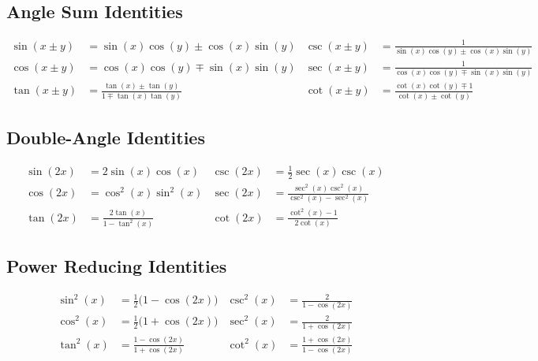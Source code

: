 \documentclass{article}
\begin{document}
\subsection{Angle Sum Identities}
\begin{align*}
	\sin{\left( x\pm y \right)} &= \sin{\left( x \right)} \cos{\left( y \right)} \pm \cos{\left( x \right)} \sin{\left( y \right)}           & \csc{\left( x\pm y \right)} &= \frac{1}{\sin{\left( x \right)} \cos{\left( y \right)} \pm \cos{\left( x \right)} \sin{\left( y \right)}} \\
	\cos{\left( x\pm y \right)} &= \cos{\left( x \right)} \cos{\left( y \right)} \mp \sin{\left( x \right)} \sin{\left( y \right)}           & \sec{\left( x\pm y \right)} &= \frac{1}{\cos{\left( x \right)} \cos{\left( y \right)} \mp \sin{\left( x \right)} \sin{\left( y \right)}} \\
	\tan{\left( x\pm y \right)} &= \frac{\tan{\left( x \right)}\pm\tan{\left( y \right)}}{1\mp \tan{\left( x \right)}\tan{\left( y \right)}} & \cot{\left( x\pm y \right)} &= \frac{\cot{\left( x \right)}\cot{\left( y \right)}\mp 1}{\cot{\left( x \right)}\pm\cot{\left( y \right)}}   
\end{align*}
\subsection{Double-Angle Identities}
\begin{align*}
	\sin{\left( 2x \right)} &= 2\sin{\left( x \right)}\cos{\left( x \right)}              & \csc{\left( 2x \right)} &= \frac{1}{2}\sec{\left( x \right)}\csc{\left( x \right)} \\
	\cos{\left( 2x \right)} &= \cos^2{\left( x \right)} \sin^2{\left( x \right)}          & \sec{\left( 2x \right)} &= \frac{\sec^2{\left( x \right)}\csc^2{\left( x \right)}}{\csc^2{\left( x \right)}-\sec^2{\left( x \right)}} \\
	\tan{\left( 2x \right)} &= \frac{2\tan{\left( x \right)}}{1-\tan^2{\left( x \right)}} & \cot{\left( 2x \right)} &= \frac{\cot^2{\left( x \right)}-1}{2\cot{\left( x \right)}} 
\end{align*}
\subsection{Power Reducing Identities}
\begin{align*}
	\sin^2{\left( x \right)} &= \frac{1}{2}\bigl( 1-\cos{\left( 2x \right)} \bigr)          & \csc^2{\left( x \right)} &= \frac{2}{1-\cos{\left( 2x \right)}} \\
	\cos^2{\left( x \right)} &= \frac{1}{2}\bigl( 1+\cos{\left( 2x \right)} \bigr)          & \sec^2{\left( x \right)} &= \frac{2}{1+\cos{\left( 2x \right)}} \\
	\tan^2{\left( x \right)} &= \frac{1-\cos{\left( 2x \right)}}{1+\cos{\left( 2x \right)}} & \cot^2{\left( x \right)} &= \frac{1+\cos{\left( 2x \right)}}{1-\cos{\left( 2x \right)}}
\end{align*}
\end{document}
